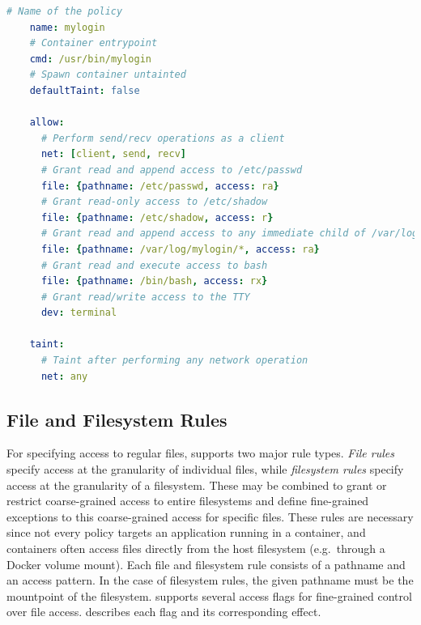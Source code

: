 \begin{lstlisting}[language=yaml, gobble=4,
  caption={[An example \bpfcontain{} policy  written in YAML]
    An example \bpfcontain{} policy for a simple remote login program, written in YAML.
    This example offers a fairly complete idea of the \bpfcontain{} policy language's
    various features.
    % Note that, in the context of a Docker container, all of the
    % \enquote{file rules} under this policy would be unnecessary; they would be implicitly
    % covered by the container's namespace membership.
    The reader is encouraged to compare
    this policy with the policy depicted in \Cref{lst:bpfbox-policy-example} on page
    \pageref{lst:bpfbox-policy-example}.
  },
  label={lst:bpfcontain-policy-example}, float]
    # Name of the policy
    name: mylogin
    # Container entrypoint
    cmd: /usr/bin/mylogin
    # Spawn container untainted
    defaultTaint: false

    allow:
      # Perform send/recv operations as a client
      net: [client, send, recv]
      # Grant read and append access to /etc/passwd
      file: {pathname: /etc/passwd, access: ra}
      # Grant read-only access to /etc/shadow
      file: {pathname: /etc/shadow, access: r}
      # Grant read and append access to any immediate child of /var/log/mylogin
      file: {pathname: /var/log/mylogin/*, access: ra}
      # Grant read and execute access to bash
      file: {pathname: /bin/bash, access: rx}
      # Grant read/write access to the TTY
      dev: terminal

    taint:
      # Taint after performing any network operation
      net: any
\end{lstlisting}

\subsection{File and Filesystem Rules}

For specifying access to regular files, \bpfcontain{} supports two major rule types.
\textit{File rules} specify access at the granularity of individual files, while
\textit{filesystem rules} specify access at the granularity of a filesystem.  These may be
combined to grant or restrict coarse-grained access to entire filesystems and define
fine-grained exceptions to this coarse-grained access for specific files. These rules are
necessary since not every \bpfcontain{} policy targets an application running in
a container, and containers often access files directly from the host filesystem
(e.g.~through a Docker volume mount). Each file and filesystem rule consists of a pathname
and an access pattern. In the case of filesystem rules, the given pathname must be the
mountpoint of the filesystem. \bpfcontain{} supports several access flags for fine-grained
control over file access.  describes each flag and its
corresponding effect.

